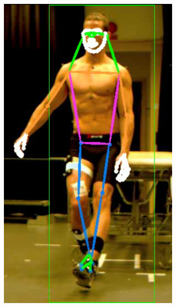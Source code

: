 {\begin{figure}[h]
\begin{subfigure}[t]{0.22\textwidth}
    \includegraphics[height=1.3\textwidth]{files/figs/res/hpe/36-7.png}
    \caption{}
  \end{subfigure}
  ~
  \begin{subfigure}[t]{0.22\textwidth}
    \centering

\end{subfigure}
\end{figure}}
